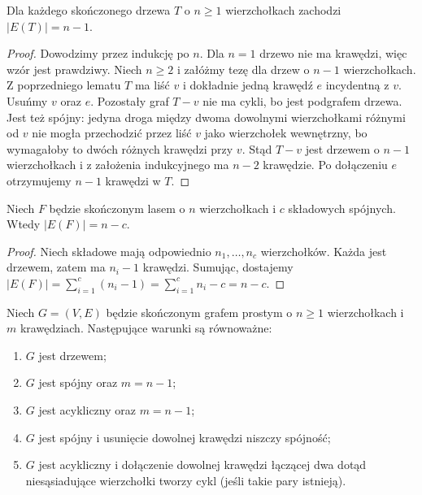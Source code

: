 \begin{twierdzenie}
Dla każdego skończonego drzewa $T$ o $n\ge1$
wierzchołkach zachodzi $|E(T)|=n-1$.
\end{twierdzenie}

\begin{proof}
Dowodzimy przez indukcję po $n$. Dla $n=1$
drzewo nie ma krawędzi, więc wzór jest prawdziwy.
Niech $n\ge2$ i załóżmy tezę dla drzew o $n-1$
wierzchołkach. Z poprzedniego lematu $T$ ma
liść $v$ i dokładnie jedną krawędź $e$ incydentną
z $v$. Usuńmy $v$ oraz $e$. Pozostały graf $T-v$
nie ma cykli, bo jest podgrafem drzewa. Jest
też spójny: jedyna droga między dwoma dowolnymi
wierzchołkami różnymi od $v$ nie mogła przechodzić
przez liść $v$ jako wierzchołek wewnętrzny, bo
wymagałoby to dwóch różnych krawędzi przy $v$.
Stąd $T-v$ jest drzewem o $n-1$ wierzchołkach
i z założenia indukcyjnego ma $n-2$ krawędzie.
Po dołączeniu $e$ otrzymujemy $n-1$ krawędzi w $T$.
\end{proof}

\begin{wniosek}
Niech $F$ będzie skończonym lasem o $n$ wierzchołkach
i $c$ składowych spójnych. Wtedy $|E(F)|=n-c$.
\end{wniosek}

\begin{proof}
Niech składowe mają odpowiednio $n_1,\ldots,n_c$
wierzchołków. Każda jest drzewem, zatem ma
$n_i-1$ krawędzi. Sumując, dostajemy
$|E(F)|=\sum_{i=1}^{c}(n_i-1)
=\sum_{i=1}^{c}n_i-c=n-c$.
\end{proof}

\begin{twierdzenie}
Niech $G=(V,E)$ będzie skończonym grafem prostym
o $n\ge1$ wierzchołkach i $m$ krawędziach.
Następujące warunki są równoważne:
\begin{enumerate}[label=(\roman*)]
\item $G$ jest drzewem;
\item $G$ jest spójny oraz $m=n-1$;
\item $G$ jest acykliczny oraz $m=n-1$;
\item $G$ jest spójny i usunięcie dowolnej
krawędzi niszczy spójność;
\item $G$ jest acykliczny i dołączenie dowolnej
krawędzi łączącej dwa dotąd niesąsiadujące
wierzchołki tworzy cykl (jeśli takie pary istnieją).
\end{enumerate}
\end{twierdzenie}

